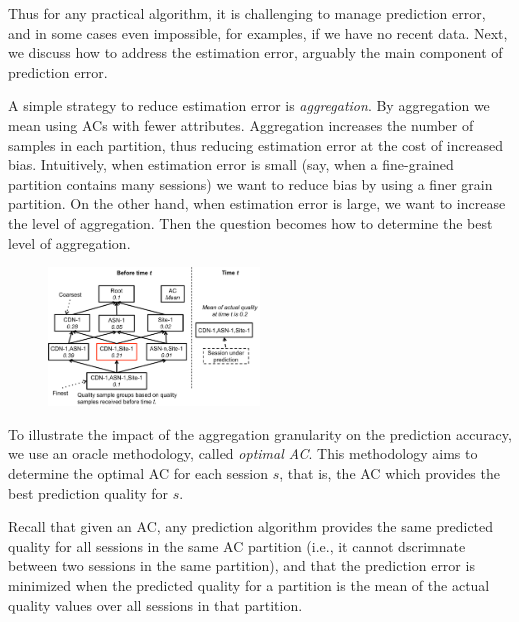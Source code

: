 Thus for any practical algorithm, it is challenging to manage
prediction error, and in some cases even impossible, for examples, if
we have no recent data. Next, we discuss how to address the estimation
error, arguably the main component of prediction error.

\label{subsec:aggregation}
A simple strategy to reduce estimation error is {\it aggregation}.  By
aggregation we mean using ACs with fewer attributes.  Aggregation
increases the number of samples in each partition, thus reducing
estimation error at the cost of increased bias.  Intuitively, when
estimation error is small (say, when a fine-grained partition contains
many sessions) we want to reduce bias by using a finer grain
partition.  On the other hand, when estimation error is large, we want
to increase the level of aggregation.  Then the question becomes how
to determine the best level of aggregation.


\begin{figure}[h!]
\centering
 \includegraphics[width=0.5\textwidth] {figures/fig-optimal-AC.pdf}
\label{fig:example-optimal-ac}
\end{figure}

 To illustrate the impact of the aggregation
granularity on the prediction accuracy, we use an oracle methodology,
called {\it optimal AC}. This methodology aims to determine the
optimal AC for each session $s$, that is, the AC which provides the
best prediction quality for $s$.

Recall that given an AC, any prediction algorithm provides the same
predicted quality for all sessions in the same AC partition (i.e., it
cannot dscrimnate between two sessions in the same partition), and
that the prediction error is minimized when the predicted quality for
a partition is the mean of the actual quality values over all sessions
in that partition.

